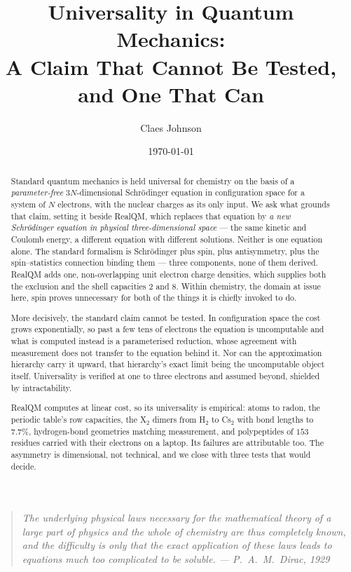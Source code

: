 \documentclass[11pt]{article}
\title{Universality in Quantum Mechanics:\\
\large A Claim That Cannot Be Tested, and One That Can}
\author[1]{Claes Johnson}
\affil[1]{KTH Royal Institute of Technology, SE-100 44 Stockholm, Sweden \\
\small\texttt{claesjohnson@gmail.com}}
\date{\today}
\begin{document}
\maketitle

\begin{quote}
\small\itshape
The underlying physical laws necessary for the mathematical theory of a large part of physics and
the whole of chemistry are thus completely known, and the difficulty is only that the exact
application of these laws leads to equations much too complicated to be soluble.
\normalfont\upshape\hfill --- P.~A.~M.~Dirac, 1929~\cite{Dirac1929}
\end{quote}

\begin{abstract}
Standard quantum mechanics is held universal for chemistry on the basis of a \emph{parameter-free}
$3N$-dimensional Schr\"odinger equation in configuration space for a system of $N$ electrons, with
the nuclear charges as its only input. We ask what grounds that claim, setting it beside RealQM,
which replaces that equation by \emph{a new Schr\"odinger equation in physical three-dimensional
space} --- the same kinetic and Coulomb energy, a different equation with different solutions.
Neither is one equation alone. The standard formalism is
Schr\"odinger plus spin, plus antisymmetry, plus the spin--statistics connection binding them ---
three components, none of them derived. RealQM adds one, non-overlapping unit electron charge
densities, which supplies both the exclusion and the shell capacities $2$ and $8$. Within
chemistry, the domain at issue here, spin proves unnecessary for both of the things it is chiefly
invoked to do.

More decisively, the standard claim cannot be tested. In configuration space the cost grows
exponentially, so past a few tens of electrons the equation is uncomputable and what is computed
instead is a parameterised reduction, whose agreement with measurement does not transfer to the
equation behind it. Nor can the approximation hierarchy carry it upward, that hierarchy's exact
limit being the uncomputable object itself. Universality is verified at one to three electrons and
assumed beyond, shielded by intractability.

RealQM computes at linear cost, so its universality is empirical: atoms to radon, the periodic
table's row capacities, the X$_2$ dimers from H$_2$ to Cs$_2$ with bond lengths to $7.7\%$,
hydrogen-bond geometries matching measurement, and
polypeptides of $153$ residues carried with their electrons on a laptop. Its failures are
attributable too. The asymmetry is dimensional, not technical, and we close with three tests that
would decide.
\end{abstract}
\end{document}
